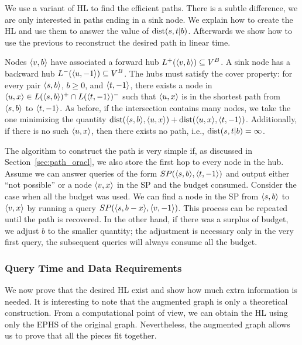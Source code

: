 We use a variant of HL to find the efficient paths.
There is a subtle difference, we are only interested in paths ending in a sink node.
We explain how to create the HL and use them to answer the value of $\text{dist}(s,t|b)$.
Afterwards we show how to use the previous to reconstruct the desired path in linear time.

Nodes $\langle v,b\rangle$ have associated a forward hub $L^+(\langle v,b\rangle)\subseteq V^B$.
A sink node has a backward hub $L^-(\langle u,-1\rangle)\subseteq V^B$.
The hubs must satisfy the cover property: for every pair $\langle s,b\rangle$, $b\geq 0$, and $\langle t,-1\rangle$, there exists a node in $\langle u,x\rangle\in L(\langle s,b\rangle)^+\cap L(\langle t,-1\rangle)^-$ such that $\langle u,x\rangle$ is in the shortest path from $\langle s,b\rangle$ to $\langle t,-1\rangle$.
As before, if the intersection contains many nodes, we take the one minimizing the quantity $\text{dist}(\langle s,b\rangle,\langle u,x\rangle)+\text{dist}(\langle u,x\rangle,\langle t,-1\rangle)$.
Additionally, if there is no such $\langle u,x\rangle$, then there exists no path, i.e., $\text{dist}(s,t|b)=\infty$.

The algorithm to construct the path is very simple if, as discussed in Section~\ref{sec:path_oracl}, we also store the first hop to every node in the hub.
Assume we can answer queries of the form $SP(\langle s,b\rangle,\langle t,-1\rangle)$ and output either ``not possible'' or a node $\langle v,x\rangle$ in the SP and the budget consumed.
Consider the case when all the budget was used.
We can find a node in the SP from $\langle s,b\rangle$ to $\langle v,x\rangle$ by running a query $SP(\langle s,b-x\rangle,\langle v,-1\rangle)$.
This process can be repeated until the path is recovered.
In the other hand, if there was a surplus of budget, we adjust $b$ to the smaller quantity; the adjustment is necessary only in the very first query, the subsequent queries will always consume all the budget.

\subsubsection{Query Time and Data Requirements}
We now prove that the desired HL exist and show how much extra information is needed.
It is interesting to note that the augmented graph is only a theoretical construction.
From a computational point of view, we can obtain the HL using only the EPHS of the original graph.
Nevertheless, the augmented graph allows us to prove that all the pieces fit together.


